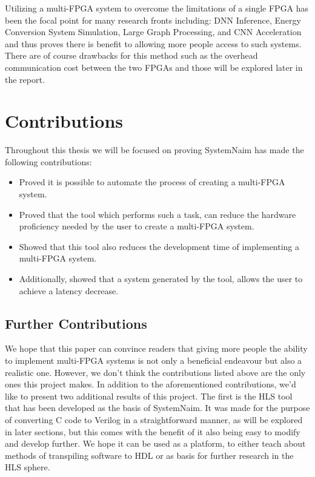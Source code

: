 Utilizing a multi-FPGA system to overcome the limitations of a single FPGA has been the focal point for many research fronts including: DNN Inference\cite{10.1145/3358192}, Energy Conversion System Simulation\cite{8822485}, Large Graph Processing\cite{10.1145/3020078.3021739}, and CNN Acceleration \cite{10.1145/3337821.3337846} and thus proves there is benefit to allowing more people access to such systems. There are of course drawbacks for this method such as the overhead communication cost between the two FPGAs and those will be explored later in the report.


\section{Contributions}
\label{sec:contributions}

Throughout this thesis we will be focused on proving SystemNaim has made the following contributions:

\begin{itemize}
    \item Proved it is possible to automate the process of creating a multi-FPGA system.
    \item Proved that the tool which performs such a task, can reduce the hardware proficiency needed by the user to create a multi-FPGA system.
    \item Showed that this tool also reduces the development time of implementing a multi-FPGA system.
    \item Additionally, showed that a system generated by the tool, allows the user to achieve a latency decrease.
\end{itemize}

\subsection{Further Contributions}

We hope that this paper can convince readers that giving more people the ability to implement multi-FPGA systems is not only a beneficial endeavour but also a realistic one. However, we don't think the contributions listed above are the only ones this project makes. In addition to the aforementioned contributions, we'd like to present two additional results of this project. The first is the HLS tool that has been developed as the basis of SystemNaim. It was made for the purpose of converting C code to Verilog in a straightforward manner, as will be explored in later sections, but this comes with the benefit of it also being easy to modify and develop further. We hope it can be used as a platform, to either teach about methods of transpiling software to HDL or as basis for further research in the HLS sphere.

